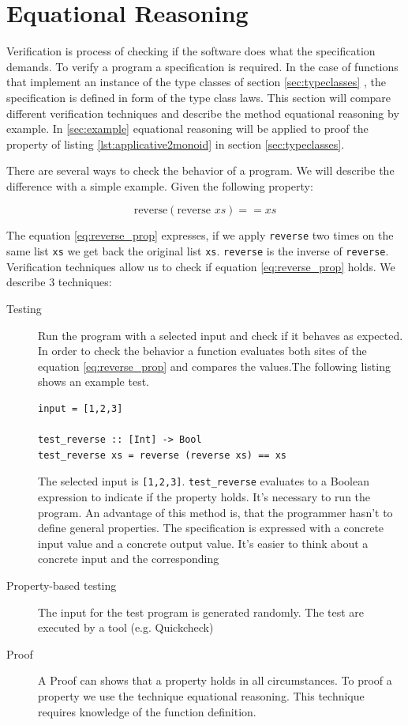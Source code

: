 \section{Equational Reasoning}
\label{sec:equationalreasoning}

Verification is process of checking if the software does what the specification demands. To verify a program a specification is required. In the case of functions that implement an instance of the type classes of section \ref{sec:typeclasses} , the specification is defined in form of the type class laws.
This section will compare different verification techniques and describe the method equational reasoning by example. In \ref{sec:example} equational reasoning will be applied to proof the property of listing \ref{lst:applicative2monoid} in section \ref{sec:typeclasses}.

There are several ways to check the behavior of a program. 
We will describe the difference with a simple example. Given the following property:

\begin{equation}
  \label{eq:reverse_prop}
\text{reverse} (\text{reverse } xs) == xs  
\end{equation}

The equation \ref{eq:reverse_prop} expresses, if we apply \verb|reverse| two times on the same list \verb|xs| we get back the original list \verb|xs|. \verb|reverse| is the inverse of \verb|reverse|. Verification techniques allow us to check if equation \ref{eq:reverse_prop} holds. We describe 3 techniques:

\begin{description}
\item[Testing] Run the program with a selected input and check if it behaves as expected. In order to check the behavior a function evaluates both sites of the equation \ref{eq:reverse_prop} and compares the values.The following listing shows an example test.

\begin{verbatim}
input = [1,2,3]

test_reverse :: [Int] -> Bool
test_reverse xs = reverse (reverse xs) == xs
\end{verbatim}

The selected input is \verb|[1,2,3]|. \verb|test_reverse| evaluates to a Boolean expression to indicate if the property holds. It's necessary to run the program.
An advantage of this method is, that the programmer hasn't to define general properties. The specification is expressed with a concrete input value and a concrete output value. It's easier to think about a concrete input and the corresponding 
\item[Property-based testing] The input for the test program is generated randomly. The test are executed by a tool (e.g. Quickcheck)
\item[Proof] A Proof can shows that a property holds in all circumstances. To proof a property we use the technique equational reasoning. This technique requires knowledge of the function definition.
\end{description}

